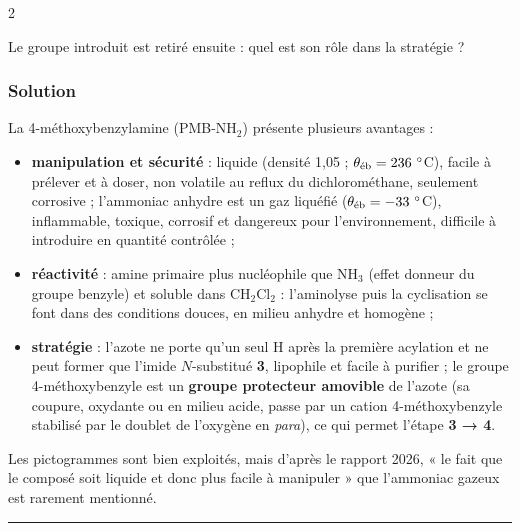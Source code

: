 \documentclass[11pt,a4paper]{article}
\providecommand{\tightlist}{\setlength{\itemsep}{0pt}\setlength{\parskip}{0pt}}
\begin{document}
\begin{indication}{2}

Le groupe introduit est retiré ensuite : quel est son rôle dans la stratégie ?

\end{indication}

\hypertarget{solution-39}{%
\subsubsection{Solution}\label{solution-39}}

La 4-méthoxybenzylamine (PMB-\(\mathrm{NH_2}\)) présente plusieurs avantages :

\begin{itemize}
\tightlist
\item
  \textbf{manipulation et sécurité} : liquide (densité 1,05 ; \(\theta_{\rm \text{éb}}=236\ ^\circ\)C), facile à prélever et à doser, non volatile au reflux du dichlorométhane, seulement corrosive ; l'ammoniac anhydre est un gaz liquéfié (\(\theta_{\rm \text{éb}}=-33\ ^\circ\)C), inflammable, toxique, corrosif et dangereux pour l'environnement, difficile à introduire en quantité contrôlée ;
\item
  \textbf{réactivité} : amine primaire plus nucléophile que \(\mathrm{NH_3}\) (effet donneur du groupe benzyle) et soluble dans \(\mathrm{CH_2Cl_2}\) : l'aminolyse puis la cyclisation se font dans des conditions douces, en milieu anhydre et homogène ;
\item
  \textbf{stratégie} : l'azote ne porte qu'un seul H après la première acylation et ne peut former que l'imide \(N\)-substitué \textbf{3}, lipophile et facile à purifier ; le groupe 4-méthoxybenzyle est un \textbf{groupe protecteur amovible} de l'azote (sa coupure, oxydante ou en milieu acide, passe par un cation 4-méthoxybenzyle stabilisé par le doublet de l'oxygène en \emph{para}), ce qui permet l'étape \textbf{3 → 4}.
\end{itemize}

\begin{jury}

Les pictogrammes sont bien exploités, mais d'après le rapport 2026, « le fait que le composé soit liquide et donc plus facile à manipuler » que l'ammoniac gazeux est rarement mentionné.

\end{jury}

\begin{center}\rule{0.5\linewidth}{0.5pt}\end{center}
\end{document}
